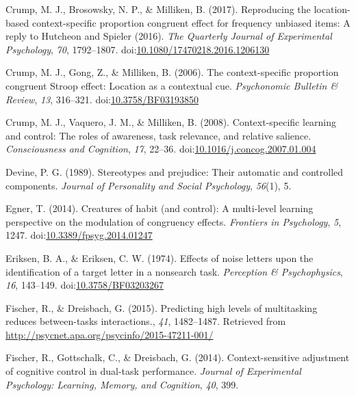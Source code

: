 \documentclass[english,,man,floatsintext]{apa6}
\begin{document}
\hypertarget{ref-crump_reproducing_2017}{}
Crump, M. J., Brosowsky, N. P., \& Milliken, B. (2017). Reproducing the
location-based context-specific proportion congruent effect for
frequency unbiased items: A reply to Hutcheon and Spieler (2016).
\emph{The Quarterly Journal of Experimental Psychology}, \emph{70},
1792--1807.
doi:\href{https://doi.org/10.1080/17470218.2016.1206130}{10.1080/17470218.2016.1206130}

\hypertarget{ref-crump_context-specific_2006}{}
Crump, M. J., Gong, Z., \& Milliken, B. (2006). The context-specific
proportion congruent Stroop effect: Location as a contextual cue.
\emph{Psychonomic Bulletin \& Review}, \emph{13}, 316--321.
doi:\href{https://doi.org/10.3758/BF03193850}{10.3758/BF03193850}

\hypertarget{ref-crump_context-specific_2008}{}
Crump, M. J., Vaquero, J. M., \& Milliken, B. (2008). Context-specific
learning and control: The roles of awareness, task relevance, and
relative salience. \emph{Consciousness and Cognition}, \emph{17},
22--36.
doi:\href{https://doi.org/10.1016/j.concog.2007.01.004}{10.1016/j.concog.2007.01.004}

\hypertarget{ref-devine_stereotypes_1989}{}
Devine, P. G. (1989). Stereotypes and prejudice: Their automatic and
controlled components. \emph{Journal of Personality and Social
Psychology}, \emph{56}(1), 5.

\hypertarget{ref-egner_creatures_2014}{}
Egner, T. (2014). Creatures of habit (and control): A multi-level
learning perspective on the modulation of congruency effects.
\emph{Frontiers in Psychology}, \emph{5}, 1247.
doi:\href{https://doi.org/10.3389/fpsyg.2014.01247}{10.3389/fpsyg.2014.01247}

\hypertarget{ref-eriksen_effects_1974}{}
Eriksen, B. A., \& Eriksen, C. W. (1974). Effects of noise letters upon
the identification of a target letter in a nonsearch task.
\emph{Perception \& Psychophysics}, \emph{16}, 143--149.
doi:\href{https://doi.org/10.3758/BF03203267}{10.3758/BF03203267}

\hypertarget{ref-fischer_predicting_2015}{}
Fischer, R., \& Dreisbach, G. (2015). Predicting high levels of
multitasking reduces between-tasks interactions., \emph{41}, 1482--1487.
Retrieved from \url{http://psycnet.apa.org/psycinfo/2015-47211-001/}

\hypertarget{ref-fischer_context-sensitive_2014}{}
Fischer, R., Gottschalk, C., \& Dreisbach, G. (2014). Context-sensitive
adjustment of cognitive control in dual-task performance. \emph{Journal
of Experimental Psychology: Learning, Memory, and Cognition}, \emph{40},
399.
\end{document}
